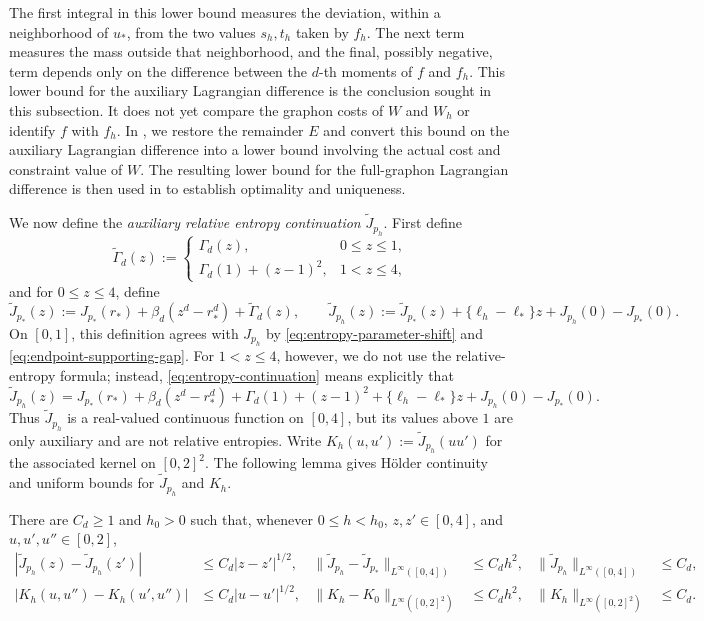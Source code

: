 The first integral in this lower bound measures the deviation, within a
neighborhood of $u_*$, from the two values $s_h,t_h$ taken by $f_h$.  The
next term measures the mass outside that neighborhood, and the final,
possibly negative, term depends only on the difference between the $d$-th
moments of $f$ and $f_h$.  This lower bound for the auxiliary Lagrangian
difference is the conclusion sought in this subsection.  It does not yet
compare the graphon costs of $W$ and $W_h$ or identify $f$ with $f_h$.  In
, we restore the remainder $E$ and
convert this bound on the auxiliary Lagrangian difference into a lower bound
involving the actual cost and constraint value of $W$.  The resulting lower
bound for the full-graphon Lagrangian difference is then used in
 to establish optimality and uniqueness.

We now define the \emph{auxiliary relative entropy continuation} $\widetilde J_{p_h}$.  First define
\[
  \widetilde\Gamma_d(z):=
  \begin{cases}
    \Gamma_d(z),&0\le z\le1,\\
    \Gamma_d(1)+(z-1)^2,&1<z\le4,
  \end{cases}
\]
and for $0 \le z \le 4$, define
\begin{equation}\label{eq:entropy-continuation}
  \widetilde J_{p_*}(z)
  :=J_{p_*}(r_*)+\beta_d(z^d-r_*^d)
  +\widetilde\Gamma_d(z),
  \qquad
  \widetilde J_{p_h}(z)
  :=\widetilde J_{p_*}(z)+\{\ell_h-\ell_*\}z+J_{p_h}(0)-J_{p_*}(0).
\end{equation}
On $[0,1]$, this definition agrees with $J_{p_h}$ by
\eqref{eq:entropy-parameter-shift} and \eqref{eq:endpoint-supporting-gap}.  For
$1<z\le4$, however, we do not use the relative-entropy formula; instead,
\eqref{eq:entropy-continuation} means explicitly that
\[
  \widetilde J_{p_h}(z)
  =J_{p_*}(r_*)+\beta_d(z^d-r_*^d)+\Gamma_d(1)+(z-1)^2
   +\{\ell_h-\ell_*\}z+J_{p_h}(0)-J_{p_*}(0).
\]
Thus $\widetilde J_{p_h}$ is a real-valued continuous function on $[0,4]$,
but its values above $1$ are only auxiliary and are not relative entropies.
Write
$K_h(u,u'):=\widetilde J_{p_h}(uu')$ for the associated kernel on $[0,2]^2$.
The following lemma gives H\"older continuity and uniform bounds for
$\widetilde J_{p_h}$ and $K_h$.
\begin{lemma}
\label{lem:continuation-kernel-bounds}
There are $C_d\ge1$ and $h_0>0$ such that, whenever $0\le h<h_0$,
$z,z'\in[0,4]$, and $u,u',u''\in[0,2]$,
\begin{equation}\label{eq:continuation-kernel-bounds}
  \begin{aligned}
    |\widetilde J_{p_h}(z)-\widetilde J_{p_h}(z')|&\le C_d|z-z'|^{1/2},
    & \|\widetilde J_{p_h}-\widetilde J_{p_*}\|_{L^\infty([0,4])}&\le C_dh^2,
    & \|\widetilde J_{p_h}\|_{L^\infty([0,4])}&\le C_d,
    \\
    |K_h(u,u'')-K_h(u',u'')| &\le C_d|u-u'|^{1/2},
    & \|K_h-K_0\|_{L^\infty([0,2]^2)}&\le C_dh^2,
    & \|K_h\|_{L^\infty([0,2]^2)}&\le C_d.
  \end{aligned}
\end{equation}
\end{lemma}

